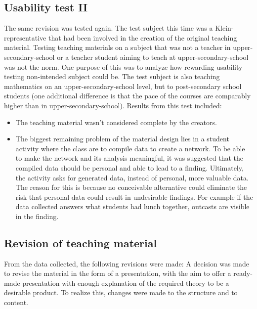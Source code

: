 \subsection{Usability test II}
The same revision was tested again. The test subject this time was a Klein-representative that had been involved in the creation of the original teaching material. Testing teaching materials on a subject that was not a teacher in upper-secondary-school or a teacher student aiming to teach at upper-secondary-school was not the norm. One purpose of this was to analyze how rewarding usability testing non-intended subject could be. The test subject is also teaching mathematics on an upper-secondary-school level, but to post-secondary school students (one additional difference is that the pace of the courses are comparably higher than in upper-secondary-school). Results from this test included:
\begin{itemize}
    \item The teaching material wasn't considered complete by the creators.
    \item The biggest remaining problem of the material design lies in a student activity where the class are to compile data to create a network. To be able to make the network and its analysis meaningful, it was suggested that the compiled data should be personal and able to lead to a finding. Ultimately, the activity asks for generated data, instead of personal, more valuable data. The reason for this is because no conceivable alternative could eliminate the risk that personal data could result in undesirable findings. For example if the data collected answers what students had lunch together, outcasts are visible in the finding.
\end{itemize}
\subsection{Revision of teaching material}
From the data collected, the following revisions were made:
A decision was made to revise the material in the form of a presentation, with the aim to offer a ready-made presentation with enough explanation of the required theory to be a desirable product. To realize this, changes were made to the structure and to content.
